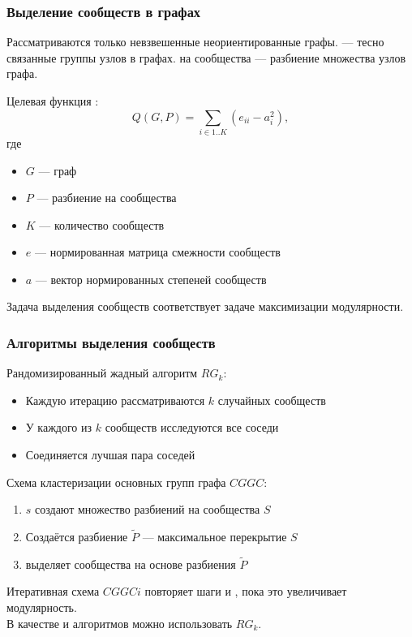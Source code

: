 \begin{frame}
	\frametitle{Выделение сообществ в графах}
	Рассматриваются только невзвешенные неориентированные графы.
	 --- тесно связанные группы узлов в графах.
	 на сообщества --- разбиение множества узлов графа.\vspace{1em}

	\pause

	Целевая функция :
	$$Q(G, P) = \sum_{i \in 1..K}{\left(e_{ii} - a_i^2\right)},$$
	где
	\begin{itemize} 
		\item $G$ --- граф
		\item $P$ --- разбиение на сообщества
		\item $K$ --- количество сообществ
		\item $e$ --- нормированная матрица смежности сообществ
		\item $a$ --- вектор нормированных степеней сообществ
	\end{itemize}

	Задача выделения сообществ соответствует задаче максимизации модулярности.
\end{frame}


\begin{frame}
	\frametitle{Алгоритмы выделения сообществ}

	Рандомизированный жадный алгоритм $RG_k$:
	\begin{itemize}
		\item Каждую итерацию рассматриваются $k$ случайных сообществ
		\item У каждого из $k$ сообществ исследуются все соседи
		\item Соединяется лучшая пара соседей
	\end{itemize}\vspace{0.5em}

	\pause

	Схема кластеризации основных групп графа $CGGC$:
	\begin{enumerate}
		\item $s$  создают множество разбиений на сообщества $S$
		\item Создаётся разбиение $\widetilde{P}$ --- максимальное перекрытие $S$
		\item {} выделяет сообщества на основе разбиения $\widetilde{P}$
	\end{enumerate}

	\pause

	Итеративная схема $CGGCi$ повторяет шаги  и , пока это увеличивает модулярность.\\
	В качестве  и  алгоритмов можно использовать $RG_k$.
\end{frame}


